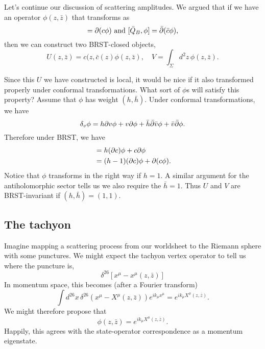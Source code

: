 Let's continue our discussion of scattering amplitudes. We argued that if we have an operator $\phi(z,\bar z)$ that transforms as
\begin{equation}
    [Q_B,\phi]=\p(c\phi)\text{ and }[\bar Q_B,\phi]=\bar \p(\bar c \phi),
\end{equation}
then we can construct two BRST-closed objects,
\begin{equation}
    U(z,\bar z)=c(z,\bar c(z) \phi(z,\bar z),\quad V=\int_\Sigma d^2z\, \phi(z,\bar z).
\end{equation}

Since this $U$ we have constructed is local, it would be nice if it also transformed properly under conformal transformations. What sort of $\phi$s will satisfy this property? Assume that $\phi$ has weight $(h,\bar h)$. Under conformal transformations, we have
\begin{equation}
    \delta_v \phi = h\partial v \phi + v \partial \phi + \bar h \bar {\partial} \bar v \phi+ \bar v \bar {\partial} \phi.
\end{equation}
Therefore under BRST, we have
\begin{align*}
    [Q_B,\phi] &= h(\p c) \phi + c\p \phi\\
        &=(h-1)(\p c) \phi + \p(c\phi).
\end{align*}
Notice that $\phi$ transforms in the right way if $h=1$. A similar argument for the antiholomorphic sector tells us we also require the $\bar h=1$. Thus $U$ and $V$ are BRST-invariant if $(h,\bar h)=(1,1)$.

\subsection*{The tachyon}
Imagine mapping a scattering process from our worldsheet to the Riemann sphere with some punctures. We might expect the tachyon vertex operator to tell us where the puncture is,
\begin{equation}
    \delta^{26}[x^\mu- x^\mu(z,\bar z)]
\end{equation}
In momentum space, this becomes (after a Fourier transform)
\begin{equation}
    \int d^{26}x \, \delta^{26}(x^\mu -X^\mu(z,\bar z))e^{ik_\mu x^\mu} = e^{ik_\mu X^\mu(z,\bar z)}.
\end{equation}
We might therefore propose that
\begin{equation}
    \phi(z,\bar z)=e^{ik_\mu X^\mu(z,\bar z)}.
\end{equation}
Happily, this agrees with the state-operator correspondence as a momentum eigenstate.

